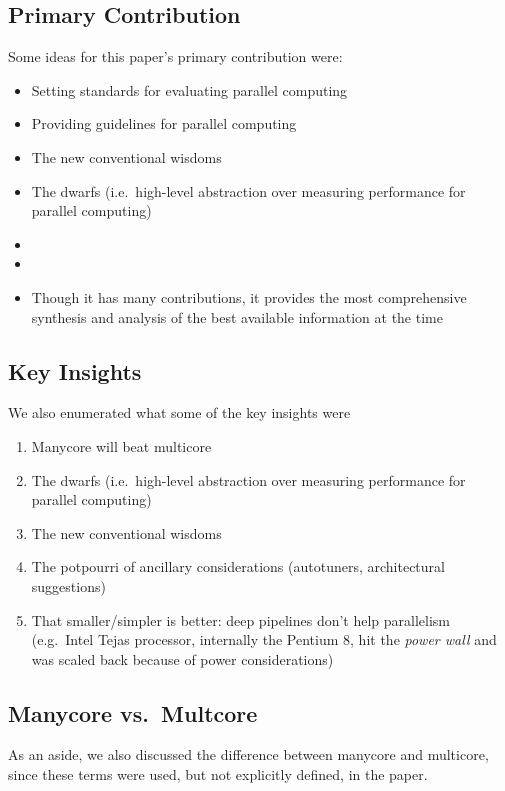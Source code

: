 \subsection{Primary Contribution}\label{feb-11:a-view:contribution}
Some ideas for this paper's primary contribution were:
\begin{itemize}
    \item Setting standards for evaluating parallel computing
    \item Providing guidelines for parallel computing
    \item The new conventional wisdoms
    \item The dwarfs (i.e.\ high-level abstraction over measuring performance for parallel computing)
    \item %
    \item %
    \item Though it has many contributions, it provides the most comprehensive synthesis and analysis of the best available information at the time
\end{itemize}

\subsection{Key Insights}\label{feb-11:a-view:insights}

We also enumerated what some of the key insights were
\begin{enumerate}
    \item Manycore will beat multicore
    \item The dwarfs (i.e.\ high-level abstraction over measuring performance for parallel computing)
    \item The new conventional wisdoms
    \item The potpourri of ancillary considerations (autotuners, architectural suggestions)
    \item That smaller/simpler is better: deep pipelines don't help parallelism (e.g.\ Intel Tejas processor, internally the Pentium 8, hit the \textit{power wall} and was scaled back because of power considerations)
\end{enumerate}

\subsection{Manycore vs.\ Multcore}\label{feb-11:a-view:many-vs-multi}
As an aside, we also discussed the difference between manycore and multicore, since these terms were used, but not explicitly defined, in the paper.

